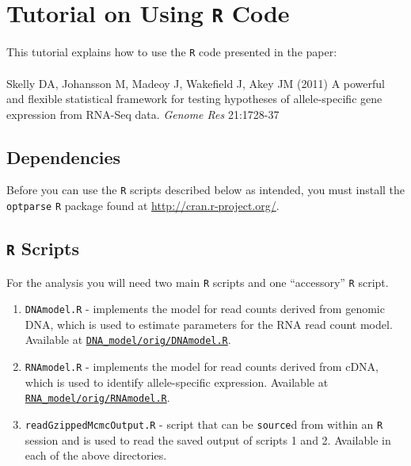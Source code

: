 \documentclass[12pt,]{article}
\begin{document}
\section{Tutorial on Using {\tt R} Code}
This tutorial explains how to use the {\tt R} code presented in the paper: \\ \\
Skelly DA, Johansson M, Madeoy J, Wakefield J, Akey JM (2011) A powerful 
and flexible statistical framework for testing hypotheses of allele-specific gene 
expression from RNA-Seq data. \emph{Genome Res} 21:1728-37\\

\subsection{Dependencies}
Before you can use the {\tt R} scripts described below as intended, you must
install the {\tt optparse} {\tt R} package found at \url{http://cran.r-project.org/}.

\subsection{{\tt R} Scripts}
For the analysis you will need two main {\tt R} scripts and one ``accessory'' 
{\tt R} script.
\begin{enumerate}
\item {\tt DNAmodel.R} - implements the model for read counts derived from 
genomic DNA, which is used to estimate parameters for the RNA read count model.
Available at \href{https://github.com/daskelly/ase/DNA\_model/orig/DNAmodel.R}{\nolinkurl{DNA\_model/orig/DNAmodel.R}}.
\item {\tt RNAmodel.R} - implements the model for read counts derived from
cDNA, which is used to identify allele-specific expression.
Available at \href{https://github.com/daskelly/ase/RNA\_model/orig/RNAmodel.R}{\nolinkurl{RNA\_model/orig/RNAmodel.R}}.
\item {\tt readGzippedMcmcOutput.R} - script that can be {\tt source}d 
from within an {\tt R} session and is used to read the saved output of 
scripts 1 and 2. Available in each of the above directories.
\end{enumerate}
\end{document}
